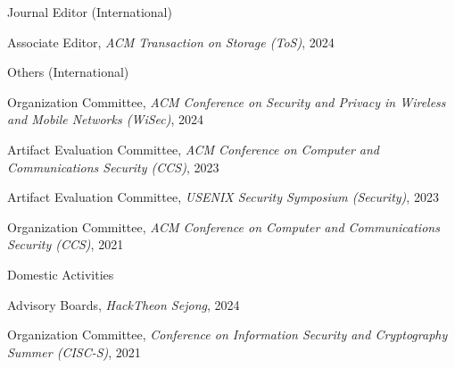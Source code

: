 \documentclass[11pt,letterpaper]{article}
\begin{document}
\begin{topic}{Journal Editor (International)}{}
  \item{Associate Editor, \emph{ACM Transaction on Storage (ToS)}, 2024} %
\end{topic}

\begin{topic}{Others (International)}{}
  \item{Organization Committee, \emph{ACM Conference on Security and Privacy in Wireless and Mobile Networks (WiSec)}, 2024} %
  \item{Artifact Evaluation Committee, \emph{ACM Conference on Computer and Communications Security (CCS)}, 2023} %
  \item{Artifact Evaluation Committee, \emph{USENIX Security Symposium (Security)}, 2023} %
  \item{Organization Committee, \emph{ACM Conference on Computer and Communications Security (CCS)}, 2021} %
\end{topic}

\begin{topic}{Domestic Activities}{}
  \item{Advisory Boards, \emph{HackTheon Sejong}, 2024} %
  \item{Organization Committee, \emph{Conference on Information Security and Cryptography Summer (CISC-S)}, 2021} %
\end{topic}
\end{document}
